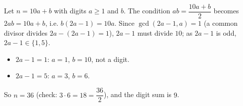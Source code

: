 Let $n=10a+b$ with digits $a\ge1$ and $b$. The condition $ab=\dfrac{10a+b}{2}$ becomes $2ab=10a+b$, i.e. $b(2a-1)=10a$. Since $\gcd(2a-1,a)=1$ (a common divisor divides $2a-(2a-1)=1$), $2a-1$ must divide $10$; as $2a-1$ is odd, $2a-1\in\{1,5\}$.
\begin{itemize}
\item $2a-1=1$: $a=1$, $b=10$, not a digit.
\item $2a-1=5$: $a=3$, $b=6$.
\end{itemize}
So $n=36$ (check: $3\cdot6=18=\dfrac{36}{2}$), and the digit sum is $\boxed{9}$.
